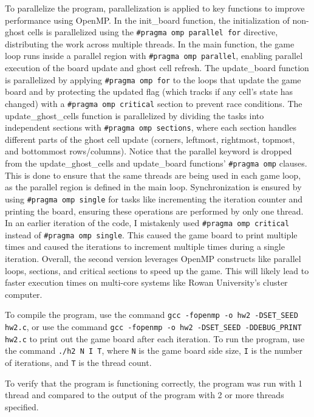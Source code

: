 \documentclass{article}
\begin{document}
	To parallelize the program, parallelization is applied to key functions to improve performance using OpenMP. In the init\_board function, the initialization of non-ghost cells is parallelized using the \texttt{\#pragma omp parallel for} directive, distributing the work across multiple threads. In the main function, the game loop runs inside a parallel region with \texttt{\#pragma omp parallel}, enabling parallel execution of the board update and ghost cell refresh. The update\_board function is parallelized by applying \texttt{\#pragma omp for} to the loops that update the game board and by protecting the updated flag (which tracks if any cell's state has changed) with a \texttt{\#pragma omp critical} section to prevent race conditions. The update\_ghost\_cells function is parallelized by dividing the tasks into independent sections with \texttt{\#pragma omp sections}, where each section handles different parts of the ghost cell update (corners, leftmost, rightmost, topmost, and bottommost rows/columns). Notice that the parallel keyword is dropped from the update\_ghost\_cells and update\_board functions’ \texttt{\#pragma omp} clauses. This is done to ensure that the same threads are being used in each game loop, as the parallel region is defined in the main loop. Synchronization is ensured by using \texttt{\#pragma omp single} for tasks like incrementing the iteration counter and printing the board, ensuring these operations are performed by only one thread. In an earlier iteration of the code, I mistakenly used \texttt{\#pragma omp critical} instead of \texttt{\#pragma omp single}. This caused the game board to print multiple times and caused the iterations to increment multiple times during a single iteration. Overall, the second version leverages OpenMP constructs like parallel loops, sections, and critical sections to speed up the game. This will likely lead to faster execution times on multi-core systems like Rowan University’s cluster computer.
	
	To compile the program, use the command \texttt{gcc -fopenmp -o hw2 -DSET\_SEED hw2.c}, or use the command \texttt{gcc -fopenmp -o hw2 -DSET\_SEED -DDEBUG\_PRINT hw2.c} to print out the game board after each iteration. To run the program, use the command \texttt{./h2 N I T}, where \texttt{N} is the game board side size, \texttt{I} is the number of iterations, and \texttt{T} is the thread count.
	
	To verify that the program is functioning correctly, the program was run with 1 thread and compared to the output of the program with 2 or more threads specified.
\end{document}
